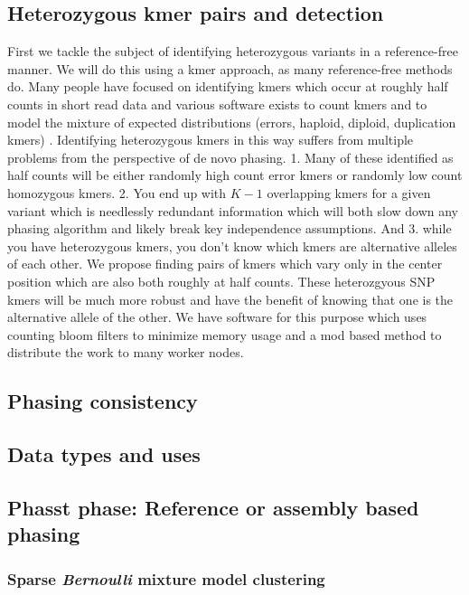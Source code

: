 \subsection{Heterozygous kmer pairs and detection}
First we tackle the subject of identifying heterozygous variants in a reference-free manner. We will do this using a kmer approach, as many reference-free methods do. 
Many people have focused on identifying kmers which occur at roughly half counts in short read data \cite{KAT} and various software exists to count kmers \cite{jellyfish} 
and to model the mixture of expected distributions (errors, haploid, diploid, duplication kmers) \cite{genomescope}. Identifying heterozygous kmers in this way 
suffers from multiple problems from the perspective of de novo phasing. 1. Many of these identified as half counts will be either randomly high count error kmers or randomly low count 
homozygous kmers. 2. You end up with $K-1$ overlapping kmers for a given variant which is needlessly redundant information which will both slow down any phasing algorithm and 
likely break key independence assumptions. And 3. while you have heterozygous kmers, you don't know which kmers are alternative alleles of each other. 
We propose finding pairs of kmers which vary only in the center position which are also both roughly at half counts. These heterozgyous SNP kmers 
will be much more robust and have the benefit of knowing that one is the alternative allele of the other.
We have software for this purpose \cite{het_kmers} which uses counting bloom filters to minimize memory usage and a mod based method to 
distribute the work to many worker nodes.

\subsection{Phasing consistency}

\subsection{Data types and uses}


\subsection{Phasst phase: Reference or assembly based phasing}
\subsubsection{Sparse \textit{Bernoulli} mixture model clustering}
